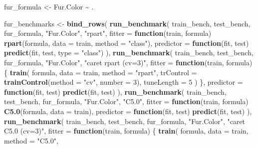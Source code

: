 \documentclass[
  11pt,
]{article}
\newenvironment{Shaded}{\begin{snugshade}}{\end{snugshade}}
\newcommand{\AttributeTok}[1]{\textcolor[rgb]{0.13,0.29,0.53}{#1}}
\newcommand{\ControlFlowTok}[1]{\textcolor[rgb]{0.13,0.29,0.53}{\textbf{#1}}}
\newcommand{\DecValTok}[1]{\textcolor[rgb]{0.00,0.00,0.81}{#1}}
\newcommand{\FunctionTok}[1]{\textcolor[rgb]{0.13,0.29,0.53}{\textbf{#1}}}
\newcommand{\NormalTok}[1]{#1}
\newcommand{\OtherTok}[1]{\textcolor[rgb]{0.56,0.35,0.01}{#1}}
\newcommand{\SpecialCharTok}[1]{\textcolor[rgb]{0.81,0.36,0.00}{\textbf{#1}}}
\newcommand{\StringTok}[1]{\textcolor[rgb]{0.31,0.60,0.02}{#1}}
\begin{document}
\begin{Shaded}
\begin{Highlighting}[]
\NormalTok{fur\_formula }\OtherTok{\textless{}{-}}\NormalTok{ Fur.Color }\SpecialCharTok{\textasciitilde{}}\NormalTok{ .}

\NormalTok{fur\_benchmarks }\OtherTok{\textless{}{-}} \FunctionTok{bind\_rows}\NormalTok{(}
  \FunctionTok{run\_benchmark}\NormalTok{(}
\NormalTok{    train\_bench, test\_bench, fur\_formula, }\StringTok{"Fur.Color"}\NormalTok{, }\StringTok{"rpart"}\NormalTok{,}
    \AttributeTok{fitter =} \ControlFlowTok{function}\NormalTok{(train, formula) }\FunctionTok{rpart}\NormalTok{(formula, }\AttributeTok{data =}\NormalTok{ train, }\AttributeTok{method =} \StringTok{"class"}\NormalTok{),}
    \AttributeTok{predictor =} \ControlFlowTok{function}\NormalTok{(fit, test) }\FunctionTok{predict}\NormalTok{(fit, test, }\AttributeTok{type =} \StringTok{"class"}\NormalTok{)}
\NormalTok{  ),}
  \FunctionTok{run\_benchmark}\NormalTok{(}
\NormalTok{    train\_bench, test\_bench, fur\_formula, }\StringTok{"Fur.Color"}\NormalTok{, }\StringTok{"caret rpart (cv=3)"}\NormalTok{,}
    \AttributeTok{fitter =} \ControlFlowTok{function}\NormalTok{(train, formula) \{}
      \FunctionTok{train}\NormalTok{(}
\NormalTok{        formula, }\AttributeTok{data =}\NormalTok{ train, }\AttributeTok{method =} \StringTok{"rpart"}\NormalTok{,}
        \AttributeTok{trControl =} \FunctionTok{trainControl}\NormalTok{(}\AttributeTok{method =} \StringTok{"cv"}\NormalTok{, }\AttributeTok{number =} \DecValTok{3}\NormalTok{),}
        \AttributeTok{tuneLength =} \DecValTok{5}
\NormalTok{      )}
\NormalTok{    \},}
    \AttributeTok{predictor =} \ControlFlowTok{function}\NormalTok{(fit, test) }\FunctionTok{predict}\NormalTok{(fit, test)}
\NormalTok{  ),}
  \FunctionTok{run\_benchmark}\NormalTok{(}
\NormalTok{    train\_bench, test\_bench, fur\_formula, }\StringTok{"Fur.Color"}\NormalTok{, }\StringTok{"C5.0"}\NormalTok{,}
    \AttributeTok{fitter =} \ControlFlowTok{function}\NormalTok{(train, formula) }\FunctionTok{C5.0}\NormalTok{(formula, }\AttributeTok{data =}\NormalTok{ train),}
    \AttributeTok{predictor =} \ControlFlowTok{function}\NormalTok{(fit, test) }\FunctionTok{predict}\NormalTok{(fit, test)}
\NormalTok{  ),}
  \FunctionTok{run\_benchmark}\NormalTok{(}
\NormalTok{    train\_bench, test\_bench, fur\_formula, }\StringTok{"Fur.Color"}\NormalTok{, }\StringTok{"caret C5.0 (cv=3)"}\NormalTok{,}
    \AttributeTok{fitter =} \ControlFlowTok{function}\NormalTok{(train, formula) \{}
      \FunctionTok{train}\NormalTok{(}
\NormalTok{        formula, }\AttributeTok{data =}\NormalTok{ train, }\AttributeTok{method =} \StringTok{"C5.0"}\NormalTok{,}

\end{Highlighting}
\end{Shaded}
\end{document}
